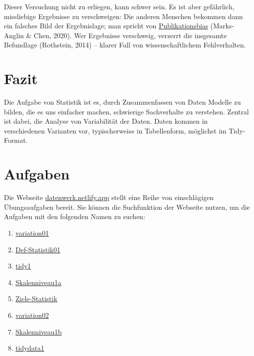 \documentclass[
  letterpaper,
]{scrbook}
\providecommand{\tightlist}{%
  \setlength{\itemsep}{0pt}\setlength{\parskip}{0pt}}\usepackage{longtable,booktabs,array}
\theoremstyle{definition}
\theoremstyle{definition}
\theoremstyle{definition}
\theoremstyle{remark}
\begin{document}
Dieser Versuchung nicht zu erliegen, kann schwer sein. Es ist aber
gefährlich, missliebige Ergebnisse zu verschweigen: Die anderen Menschen
bekommen dann ein falsches Bild der Ergebnislage; man spricht von
\href{https://de.wikipedia.org/wiki/Publikationsbias}{Publikationsbias}
(Marks‐Anglin \& Chen, 2020). Wer Ergebnisse verschweig, verzerrt die
insgesamte Befundlage (Rothstein, 2014) -- klarer Fall von
wissenschaftlichem Fehlverhalten.

\section{Fazit}\label{fazit-1}

Die Aufgabe von Statistik ist es, durch Zusammenfassen von Daten Modelle
zu bilden, die es uns einfacher machen, schwierige Sachverhalte zu
verstehen. Zentral ist dabei, die Analyse von Variabilität der Daten.
Daten kommen in verschiedenen Varianten vor, typischerweise in
Tabellenform, möglichst im Tidy-Format.

\section{Aufgaben}\label{aufgaben}

Die Webseite \href{https://datenwerk.netlify.app}{datenwerk.netlify.app}
stellt eine Reihe von einschlägigen Übungsaufgaben bereit. Sie können
die Suchfunktion der Webseite nutzen, um die Aufgaben mit den folgenden
Namen zu suchen:

\begin{enumerate}
\def\labelenumi{\arabic{enumi}.}
\tightlist
\item
  \href{https://sebastiansauer.github.io/Datenwerk/posts/variation01/variation01.html}{variation01}
\item
  \href{https://sebastiansauer.github.io/Datenwerk/posts/def-statistik01/def-statistik01}{Def-Statistik01}
\item
  \href{https://sebastiansauer.github.io/Datenwerk/posts/tidy1/tidy1.html}{tidy1}
\item
  \href{https://sebastiansauer.github.io/Datenwerk/posts/skalenniveau1a/skalenniveau1a}{Skalenniveau1a}
\item
  \href{https://sebastiansauer.github.io/Datenwerk/posts/ziele-statistik/ziele-statistik}{Ziele-Statistik}
\item
  \href{https://sebastiansauer.github.io/Datenwerk/posts/variation02/variation02.html}{variation02}
\item
  \href{https://sebastiansauer.github.io/Datenwerk/posts/skalenniveau1b/skalenniveau1b}{Skalenniveau1b}
\item
  \href{https://sebastiansauer.github.io/Datenwerk/posts/tidydata1/tidydata1.html}{tidydata1}
\end{enumerate}
\end{document}
